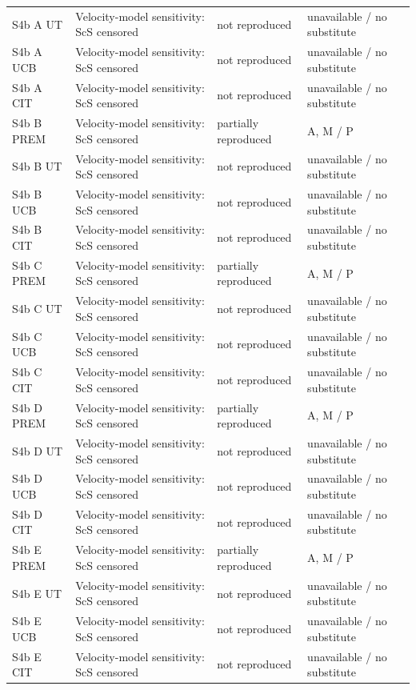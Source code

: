 \documentclass[10pt]{article}
\begin{document}
\begin{longtable}{p{.23\linewidth}p{.25\linewidth}p{.19\linewidth}p{.22\linewidth}}
S4b A UT & Velocity-model sensitivity: ScS censored & not reproduced & unavailable / no substitute \\
S4b A UCB & Velocity-model sensitivity: ScS censored & not reproduced & unavailable / no substitute \\
S4b A CIT & Velocity-model sensitivity: ScS censored & not reproduced & unavailable / no substitute \\
S4b B PREM & Velocity-model sensitivity: ScS censored & partially reproduced & A, M / P \\
S4b B UT & Velocity-model sensitivity: ScS censored & not reproduced & unavailable / no substitute \\
S4b B UCB & Velocity-model sensitivity: ScS censored & not reproduced & unavailable / no substitute \\
S4b B CIT & Velocity-model sensitivity: ScS censored & not reproduced & unavailable / no substitute \\
S4b C PREM & Velocity-model sensitivity: ScS censored & partially reproduced & A, M / P \\
S4b C UT & Velocity-model sensitivity: ScS censored & not reproduced & unavailable / no substitute \\
S4b C UCB & Velocity-model sensitivity: ScS censored & not reproduced & unavailable / no substitute \\
S4b C CIT & Velocity-model sensitivity: ScS censored & not reproduced & unavailable / no substitute \\
S4b D PREM & Velocity-model sensitivity: ScS censored & partially reproduced & A, M / P \\
S4b D UT & Velocity-model sensitivity: ScS censored & not reproduced & unavailable / no substitute \\
S4b D UCB & Velocity-model sensitivity: ScS censored & not reproduced & unavailable / no substitute \\
S4b D CIT & Velocity-model sensitivity: ScS censored & not reproduced & unavailable / no substitute \\
S4b E PREM & Velocity-model sensitivity: ScS censored & partially reproduced & A, M / P \\
S4b E UT & Velocity-model sensitivity: ScS censored & not reproduced & unavailable / no substitute \\
S4b E UCB & Velocity-model sensitivity: ScS censored & not reproduced & unavailable / no substitute \\
S4b E CIT & Velocity-model sensitivity: ScS censored & not reproduced & unavailable / no substitute \\

\end{longtable}
\end{document}
